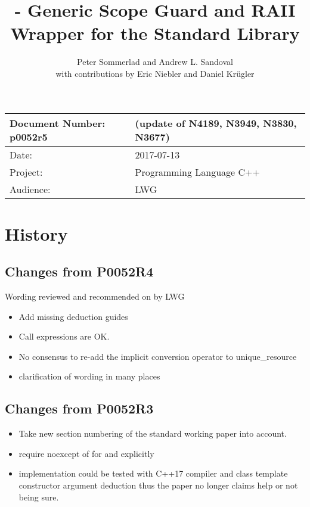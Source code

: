 \documentclass[ebook,11pt,article]{memoir}
\title{\papernumber{} - Generic Scope Guard and RAII Wrapper for the Standard Library}
\author{Peter Sommerlad and Andrew L. Sandoval\\with contributions by Eric Niebler and Daniel Kr\"ugler}
\date{\paperdate}                        %
\newcommand{\papernumber}{p0052r5}
\newcommand{\paperdate}{2017-07-13}
\begin{document}
\maketitle
\begin{tabular}[t]{|l|l|}\hline 
Document Number: \papernumber &   (update of N4189, N3949, N3830, N3677)\\\hline
Date: & \paperdate \\\hline
Project: & Programming Language C++\\\hline 
Audience: & LWG\\\hline
\end{tabular}

\chapter{History}
\section{Changes from P0052R4}
Wording reviewed and recommended on by LWG
\begin{itemize}
\item Add missing deduction guides
\item Call expressions are OK.
\item No consensus to re-add the implicit conversion operator to unique_resource
\item clarification of wording in many places
\end{itemize}

\section{Changes from P0052R3}
\begin{itemize}
\item Take new section numbering of the standard working paper into account.
\item require noexcept of  for  and  explicitly
\item implementation could be tested with C++17 compiler and class template constructor argument deduction thus the paper no longer claims help or not being sure.
\end{itemize}
\end{document}
